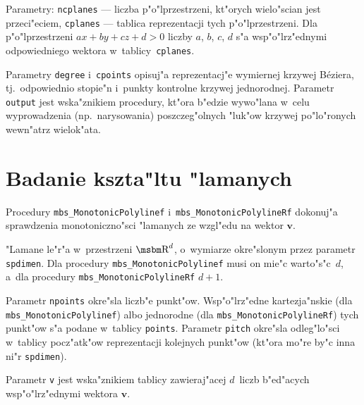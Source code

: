 Parametry: \texttt{ncplanes} --- liczba p"o"lprzestrzeni, kt"orych
wielo"scian jest przeci"eciem, \texttt{cplanes} --- tablica reprezentacji
tych p"o"lprzestrzeni. Dla p"o"lprzestrzeni $ax+by+cz+d>0$ liczby
$a$, $b$, $c$, $d$ s"a wsp"o"lrz"ednymi odpowiedniego wektora
w~tab\-li\-cy~\texttt{cplanes}.

Parametry \texttt{degree} i~\texttt{cpoints} opisuj"a reprezentacj"e
wymiernej krzywej B\'{e}ziera, tj.\ odpowiednio stopie"n i~punkty kontrolne
krzywej jednorodnej.
Parametr \texttt{output} jest wska"znikiem procedury, kt"ora b"edzie wywo"lana
w~celu wyprowadzenia (np.\ narysowania) poszczeg"olnych "luk"ow krzywej
po"lo"ronych wewn"atrz wielok"ata.


\newpage
\section{Badanie kszta"ltu "lamanych}

\begin{sloppypar}
\hspace*{\parindent}Procedury \texttt{mbs\_MonotonicPolylinef}
i~\texttt{mbs\_MonotonicPolylineRf} dokonuj"a sprawdzenia
monotoniczno"sci "lamanych ze wzgl"edu na wektor $\bm{v}$.
\end{sloppypar}

"Lamane le"r"a w~przestrzeni $\R^d$, o~wymiarze okre"slonym przez
parametr \texttt{spdimen}. Dla procedury \texttt{mbs\_MonotonicPolylinef}
musi on mie"c warto"s"c~$d$, a~dla procedury
\texttt{mbs\_MonotonicPolylineRf} $d+1$.

Parametr \texttt{npoints} okre"sla liczb"e punkt"ow. Wsp"o"lrz"edne
kartezja"nskie (dla \texttt{mbs\_MonotonicPolylinef}) albo jednorodne (dla
\texttt{mbs\_MonotonicPolylineRf}) tych punkt"ow s"a podane w~tablicy
\texttt{points}. Parametr \texttt{pitch} okre"sla odleg"lo"sci w~tablicy
pocz"atk"ow reprezentacji kolejnych punkt"ow (kt"ora mo"re by"c inna ni"r
\texttt{spdimen}).

Parametr \texttt{v} jest wska"znikiem tablicy zawieraj"acej
$d$~liczb b"ed"acych wsp"o"lrz"ednymi wektora $\bm{v}$.

